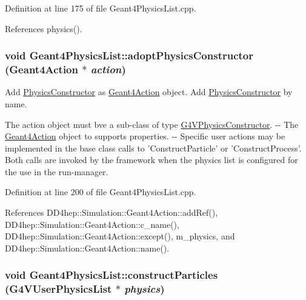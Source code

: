 Definition at line 175 of file Geant4PhysicsList.cpp.

References physics().\hypertarget{class_d_d4hep_1_1_simulation_1_1_geant4_physics_list_a36fe7b7937ffd99c7300c63983d625eb}{
\subsubsection[{adoptPhysicsConstructor}]{\setlength{\rightskip}{0pt plus 5cm}void Geant4PhysicsList::adoptPhysicsConstructor ({\bf Geant4Action} $\ast$ {\em action})}}
\label{class_d_d4hep_1_1_simulation_1_1_geant4_physics_list_a36fe7b7937ffd99c7300c63983d625eb}


Add \hyperlink{class_d_d4hep_1_1_simulation_1_1_geant4_physics_list_1_1_physics_constructor}{PhysicsConstructor} as \hyperlink{class_d_d4hep_1_1_simulation_1_1_geant4_action}{Geant4Action} object. Add \hyperlink{class_d_d4hep_1_1_simulation_1_1_geant4_physics_list_1_1_physics_constructor}{PhysicsConstructor} by name.

The action object must bve a sub-\/class of type \hyperlink{class_g4_v_physics_constructor}{G4VPhysicsConstructor}. -\/-\/ The \hyperlink{class_d_d4hep_1_1_simulation_1_1_geant4_action}{Geant4Action} object to supports properties. -\/-\/ Specific user actions may be implemented in the base class calls to 'ConstructParticle' or 'ConstructProcess'. Both calls are invoked by the framework when the physics list is configured for the use in the run-\/manager. 

Definition at line 200 of file Geant4PhysicsList.cpp.

References DD4hep::Simulation::Geant4Action::addRef(), DD4hep::Simulation::Geant4Action::c\_\-name(), DD4hep::Simulation::Geant4Action::except(), m\_\-physics, and DD4hep::Simulation::Geant4Action::name().\hypertarget{class_d_d4hep_1_1_simulation_1_1_geant4_physics_list_ab9ccc4c7870b757576312feb8674236a}{
\subsubsection[{constructParticles}]{\setlength{\rightskip}{0pt plus 5cm}void Geant4PhysicsList::constructParticles (G4VUserPhysicsList $\ast$ {\em physics})}}
\label{class_d_d4hep_1_1_simulation_1_1_geant4_physics_list_ab9ccc4c7870b757576312feb8674236a}


